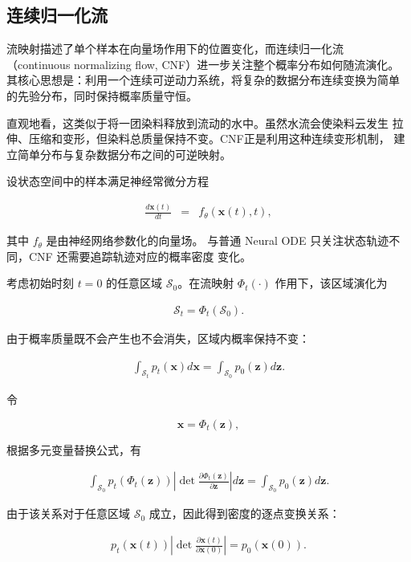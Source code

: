 \documentclass[UTF8,a4paper,zihao=-4,oneside,openany]{ctexbook}
\begin{document}
\subsection{连续归一化流}
流映射描述了单个样本在向量场作用下的位置变化，而连续归一化流
（continuous normalizing flow, CNF）进一步关注整个概率分布如何随流演化。
其核心思想是：利用一个连续可逆动力系统，将复杂的数据分布连续变换为简单
的先验分布，同时保持概率质量守恒。

直观地看，这类似于将一团染料释放到流动的水中。虽然水流会使染料云发生
拉伸、压缩和变形，但染料总质量保持不变。CNF正是利用这种连续变形机制，
建立简单分布与复杂数据分布之间的可逆映射。

设状态空间中的样本满足神经常微分方程

\begin{eqnarray}
\frac{d\mathbf{x}(t)}{dt}
&=&
f_{\theta}(\mathbf{x}(t),t),
\label{eq:cnf-ode}
\end{eqnarray}

其中 $f_{\theta}$ 是由神经网络参数化的向量场。
与普通 Neural ODE 只关注状态轨迹不同，CNF 还需要追踪轨迹对应的概率密度
变化。

考虑初始时刻 $t=0$ 的任意区域 $\mathcal{S}_0$。在流映射
$\Phi_t(\cdot)$ 作用下，该区域演化为

\begin{eqnarray}
\mathcal{S}_t=\Phi_t(\mathcal{S}_0).
\end{eqnarray}

由于概率质量既不会产生也不会消失，区域内概率保持不变：

\begin{eqnarray}
\int_{\mathcal{S}_t}p_t(\mathbf{x})d\mathbf{x}
=
\int_{\mathcal{S}_0}p_0(\mathbf{z})d\mathbf{z}.
\end{eqnarray}

令

\[
\mathbf{x}=\Phi_t(\mathbf{z}),
\]

根据多元变量替换公式，有

\begin{eqnarray}
\int_{\mathcal{S}_0}
p_t(\Phi_t(\mathbf{z}))
\left|
\det
\frac{\partial\Phi_t(\mathbf{z})}{\partial\mathbf{z}}
\right|
d\mathbf{z}
=
\int_{\mathcal{S}_0}
p_0(\mathbf{z})d\mathbf{z}.
\end{eqnarray}

由于该关系对于任意区域 $\mathcal{S}_0$ 成立，因此得到密度的逐点变换关系：

\begin{eqnarray}
p_t(\mathbf{x}(t))
\left|
\det
\frac{\partial\mathbf{x}(t)}
{\partial\mathbf{x}(0)}
\right|
=
p_0(\mathbf{x}(0)).
\end{eqnarray}
\end{document}
